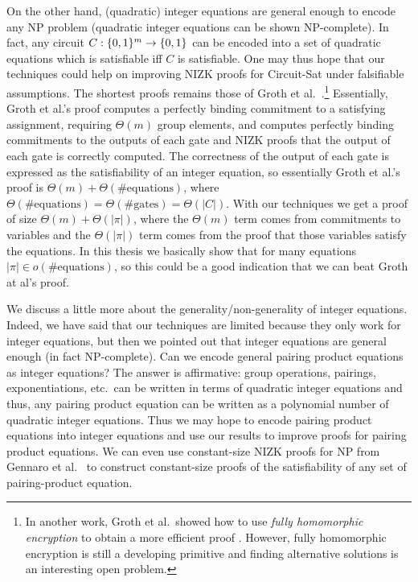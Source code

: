 On the other hand, (quadratic) integer equations are general enough to encode any NP problem (quadratic integer equations can be shown NP-complete). In fact, any circuit $C:\{0,1\}^m\to \{0,1\}$ can be encoded into a set of quadratic equations which is satisfiable iff $C$ is satisfiable.
One may thus hope that our techniques could help on improving NIZK proofs for Circuit-Sat under falsifiable assumptions. The shortest proofs remains those of Groth et al.~\cite{EC:GroOstSah06}.\footnote{In another work, Groth et al.~showed how to use \emph{fully homomorphic encryption} to obtain a more efficient proof \cite{JC:GGIPSS15}. However, fully homomorphic encryption is still a developing primitive and finding alternative solutions is an interesting open problem.} Essentially, Groth et al.'s proof computes a perfectly binding commitment to a satisfying assignment, requiring $\Theta(m)$ group elements, and computes perfectly binding commitments to the outputs of each gate and NIZK proofs that the output of each gate is correctly computed. The correctness of the output of each gate is expressed as the satisfiability of an integer equation, so essentially Groth et al.'s proof is $\Theta(m)+\Theta(\#\mathrm{equations})$, where $\Theta(\#\mathrm{equations})=\Theta(\#\mathrm{gates})=\Theta(|C|)$.
With our techniques we get a proof of size $\Theta(m)+\Theta(|\pi|)$, where the $\Theta(m)$ term comes from commitments to variables and the $\Theta(|\pi|)$ term comes from the proof that those variables satisfy the equations. In this thesis we basically show that for many equations $|\pi|\in o(\#\mathrm{equations})$, so this could be a good indication that we can beat Groth at al's proof.

We discuss a little more about the generality/non-generality of integer equations. Indeed, we have said that our techniques are limited because they only work for integer equations, but then we pointed out that integer equations are general enough (in fact NP-complete). Can we encode general pairing product equations as integer equations? The answer is affirmative: group operations, pairings, exponentiations, etc.~can be written in terms of quadratic integer equations and thus, any pairing product equation can be written as a polynomial number of quadratic integer equations. Thus we may hope to encode pairing product equations into integer equations and use our results to improve proofs for pairing product equations. We can even use constant-size NIZK proofs for NP from Gennaro et al.~\cite{EC:GGPR13} to construct constant-size proofs of the satisfiability of any set of pairing-product equation.

